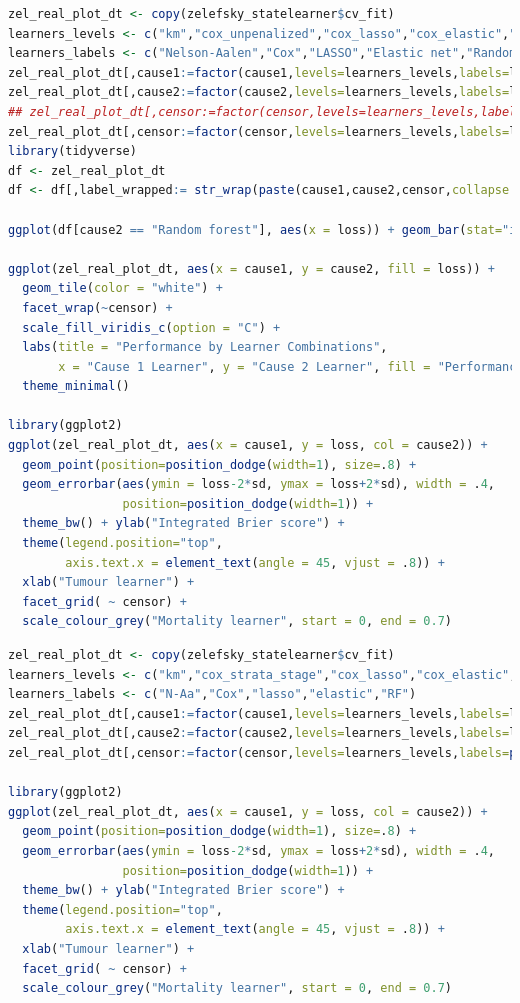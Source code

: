 \documentclass[11pt]{article}
\begin{document}
\begin{lstlisting}[language=r,numbers=none]
zel_real_plot_dt <- copy(zelefsky_statelearner$cv_fit)
learners_levels <- c("km","cox_unpenalized","cox_lasso","cox_elastic","rf")
learners_labels <- c("Nelson-Aalen","Cox","LASSO","Elastic net","Random forest")
zel_real_plot_dt[,cause1:=factor(cause1,levels=learners_levels,labels=learners_labels)]
zel_real_plot_dt[,cause2:=factor(cause2,levels=learners_levels,labels=learners_labels)]
## zel_real_plot_dt[,censor:=factor(censor,levels=learners_levels,labels=paste("Censoring learner\n", learners_labels))]
zel_real_plot_dt[,censor:=factor(censor,levels=learners_levels,labels=learners_labels)]
library(tidyverse)
df <- zel_real_plot_dt
df <- df[,label_wrapped:= str_wrap(paste(cause1,cause2,censor,collapse = ", "), width = 30)]

ggplot(df[cause2 == "Random forest"], aes(x = loss)) + geom_bar(stat="identity", position=position_dodge())+facet_grid(~cause1)

ggplot(zel_real_plot_dt, aes(x = cause1, y = cause2, fill = loss)) +
  geom_tile(color = "white") +
  facet_wrap(~censor) +
  scale_fill_viridis_c(option = "C") +
  labs(title = "Performance by Learner Combinations",
       x = "Cause 1 Learner", y = "Cause 2 Learner", fill = "Performance") +
  theme_minimal()

library(ggplot2)
ggplot(zel_real_plot_dt, aes(x = cause1, y = loss, col = cause2)) +
  geom_point(position=position_dodge(width=1), size=.8) +
  geom_errorbar(aes(ymin = loss-2*sd, ymax = loss+2*sd), width = .4,
                position=position_dodge(width=1)) +
  theme_bw() + ylab("Integrated Brier score") +
  theme(legend.position="top",
        axis.text.x = element_text(angle = 45, vjust = .8)) +
  xlab("Tumour learner") +
  facet_grid( ~ censor) +
  scale_colour_grey("Mortality learner", start = 0, end = 0.7)
\end{lstlisting}



\begin{lstlisting}[language=r,numbers=none]
zel_real_plot_dt <- copy(zelefsky_statelearner$cv_fit)
learners_levels <- c("km","cox_strata_stage","cox_lasso","cox_elastic","rf")
learners_labels <- c("N-Aa","Cox","lasso","elastic","RF")
zel_real_plot_dt[,cause1:=factor(cause1,levels=learners_levels,labels=learners_labels)]
zel_real_plot_dt[,cause2:=factor(cause2,levels=learners_levels,labels=learners_labels)]
zel_real_plot_dt[,censor:=factor(censor,levels=learners_levels,labels=paste("Censoring learner\n", learners_labels))]

library(ggplot2)
ggplot(zel_real_plot_dt, aes(x = cause1, y = loss, col = cause2)) +
  geom_point(position=position_dodge(width=1), size=.8) +
  geom_errorbar(aes(ymin = loss-2*sd, ymax = loss+2*sd), width = .4,
                position=position_dodge(width=1)) +
  theme_bw() + ylab("Integrated Brier score") +
  theme(legend.position="top",
        axis.text.x = element_text(angle = 45, vjust = .8)) +
  xlab("Tumour learner") +
  facet_grid( ~ censor) +
  scale_colour_grey("Mortality learner", start = 0, end = 0.7)
\end{lstlisting}
\end{document}
